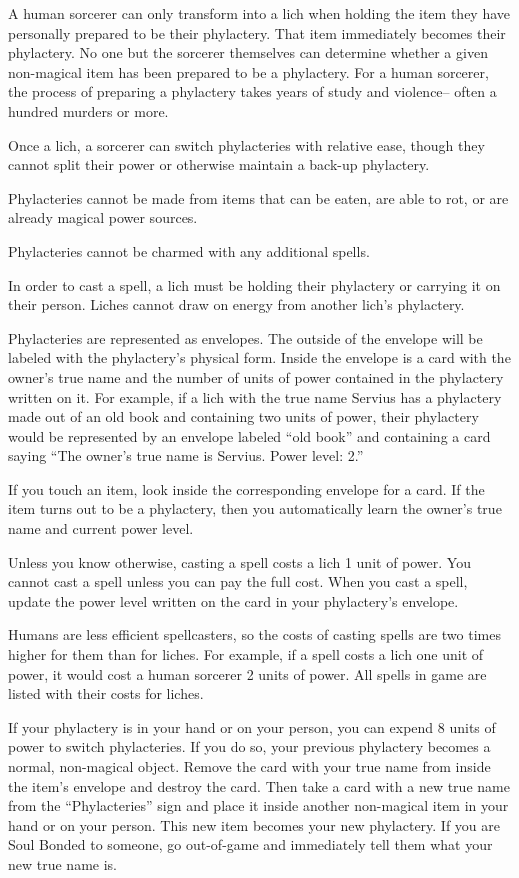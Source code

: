 \documentclass[green]{Sel}
\begin{document}
\name{\gPhylactery{}}
A human sorcerer can only transform into a lich when holding the item they have personally prepared to be their phylactery. That item immediately becomes their phylactery. No one but the sorcerer themselves can determine whether a given non-magical item has been prepared to be a phylactery. For a human sorcerer, the process of preparing a phylactery takes years of study and violence-- often a hundred murders or more. 

Once a lich, a sorcerer can switch phylacteries with relative ease, though they cannot split their power or otherwise maintain a back-up phylactery.

Phylacteries cannot be made from items that can be eaten, are able to rot, or are already magical power sources.

Phylacteries cannot be charmed with any additional spells.

In order to cast a spell, a lich must be holding their phylactery or carrying it on their person. Liches cannot draw on energy from another lich’s phylactery.

Phylacteries are represented as envelopes. The outside of the envelope will be labeled with the phylactery’s physical form. Inside the envelope is a card with the owner’s true name and the number of units of power contained in the phylactery written on it. For example, if a lich with the true name Servius has a phylactery made out of an old book and containing two units of power, their phylactery would be represented by an envelope labeled “old book” and containing a card saying “The owner’s true name is Servius. Power level: 2.”

If you touch an item, look inside the corresponding envelope for a card. If the item turns out to be a phylactery, then you automatically learn the owner’s true name and current power level.

Unless you know otherwise, casting a spell costs a lich 1 unit of power. You cannot cast a spell unless you can pay the full cost. When you cast a spell, update the power level written on the card in your phylactery’s envelope.

Humans are less efficient spellcasters, so the costs of casting spells are two times higher for them than for liches. For example, if a spell costs a lich one unit of power, it would cost a human sorcerer 2 units of power. All spells in game are listed with their costs for liches.

If your phylactery is in your hand or on your person, you can expend 8 units of power to switch phylacteries. If you do so, your previous phylactery becomes a normal, non-magical object. Remove the card with your true name from inside the item’s envelope and destroy the card. Then take a card with a new true name from the ``Phylacteries'' sign and place it inside another non-magical item in your hand or on your person. This new item becomes your new phylactery. If you are Soul Bonded to someone, go out-of-game and immediately tell them what your new true name is.
\end{document}
